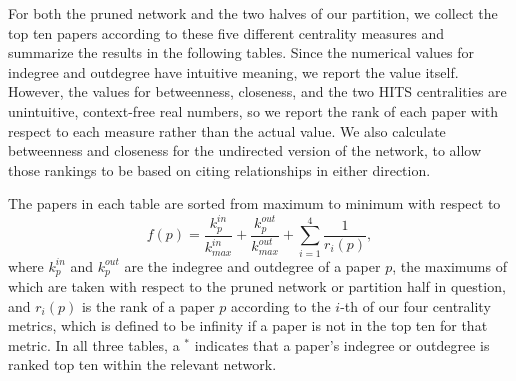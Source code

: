 \documentclass[12pt]{thesis}
\theoremstyle{plain}
\theoremstyle{definition}
\theoremstyle{remark}
\begin{document}
For both the pruned network and the two halves of our partition, we collect the top ten papers according to these five different centrality measures and summarize the results in the following tables. Since the numerical values for indegree and outdegree have intuitive meaning, we report the value itself. However, the values for betweenness, closeness, and the two HITS centralities are unintuitive, context-free real numbers, so we report the rank of each paper with respect to each measure rather than the actual value. We also calculate betweenness and closeness for the undirected version of the network, to allow those rankings to be based on citing relationships in either direction.

The papers in each table are sorted from maximum to minimum with respect to \[ f(p) = \frac{k^{in}_p}{k^{in}_{max}} + \frac{k^{out}_p}{ k^{out}_{max}} + \sum_{i=1}^4 \frac{1}{r_i(p)}, \] where $k^{in}_p$ and $k^{out}_p$ are the indegree and outdegree of a paper $p$, the maximums of which are taken with respect to the pruned network or partition half in question, and $r_i(p)$ is the rank of a paper $p$ according to the $i$-th of our four centrality metrics, which is defined to be infinity if a paper is not in the top ten for that metric. In all three tables, a $^*$ indicates that a paper's indegree or outdegree is ranked top ten within the relevant network.
 
\end{document}
